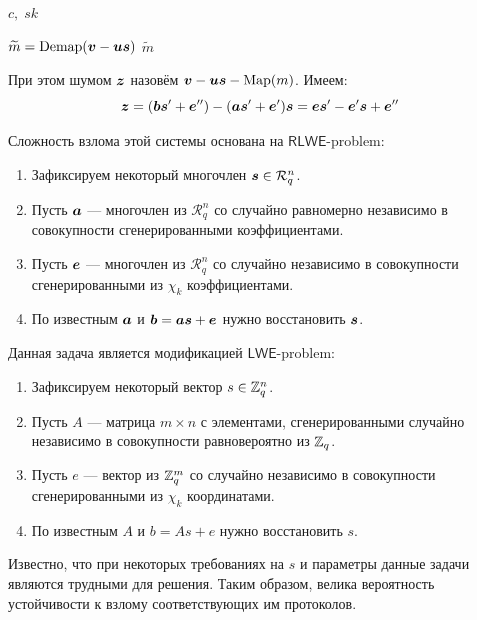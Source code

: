 \begin{algorithm}
	\caption{Расшифрование}
	\begin{algorithmic}
		\Require $c, \; sk$
		\item $\widetilde m = \Demap(\bold v-\bold u\bold s)$
		\Ensure $\widetilde{m}$
	\end{algorithmic}
\end{algorithm}

При этом шумом $\bold z$ назовём $\bold v-\bold u\bold s-\Map(m)$. Имеем:
\begin{equation}
	\bold z = (\bold b\bold{s'}+\bold{e''})-(\bold a\bold{s'}+\bold{e'})\bold s = \bold e\bold{s'}-\bold{e'}\bold s+\bold{e''}
\end{equation}

\newpage
Сложность взлома этой системы основана на $\mathsf{RLWE}$-problem:
\begin{enumerate}
	\item Зафиксируем некоторый многочлен $\bold s \in \mathcal{R}_q^n$.
	\item Пусть $\bold a$ --- многочлен из $\mathcal{R}_q^n$ со случайно равномерно независимо в совокупности сгенерированными коэффициентами.
	\item Пусть $\bold e$ --- многочлен из $\mathcal{R}_q^n$ со случайно независимо в совокупности сгенерированными из $\chi_k$ коэффициентами.
	\item По известным $\bold a$ и $\bold b = \bold a\bold s+\bold e$ нужно восстановить $\bold s$.
\end{enumerate}

Данная задача является модификацией $\mathsf{LWE}$-problem:
\begin{enumerate}
	\item Зафиксируем некоторый вектор $s \in \Z_q^n$.
	\item Пусть $A$ --- матрица $m \times n$ с элементами, сгенерированными случайно независимо в совокупности равновероятно из $\Z_q$.
	\item Пусть $e$ --- вектор из $\Z_q^m$ со случайно независимо в совокупности сгенерированными из $\chi_k$ координатами.
	\item По известным $A$ и $b = As+e$ нужно восстановить $s$.
\end{enumerate}

Известно, что при некоторых требованиях на $s$ и параметры данные задачи являются трудными для решения. Таким образом, велика вероятность устойчивости к взлому соответствующих им протоколов.

